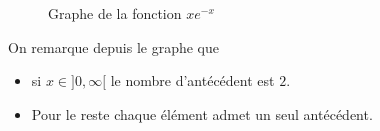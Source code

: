 \documentclass{report}
\begin{document}
\begin{myproof}
\begin{itemize}
  \begin{figure}[htpb]
  \begin{center}
  \end{center}
  \caption{Graphe de la fonction $xe^{-x}$}%
  \label{fig:}
  \end{figure}
 On remarque depuis le graphe que

 \begin{itemize}
   \item si $x\in ]0,\infty[$ le nombre d'antécédent est $2$.
   \item Pour le reste chaque élément admet un seul antécédent.
 \end{itemize}
\end{itemize}
\end{myproof}

\newpage

\end{document}
